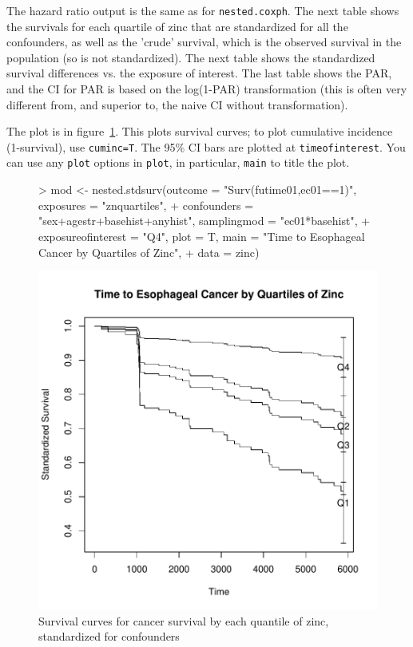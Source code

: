 \documentclass[10pt]{article}
\begin{document}
The hazard ratio output is the same as for \texttt{nested.coxph}.  The next table shows
the survivals for each quartile of zinc that are standardized for all the confounders, as
well as the 'crude' survival, which is the observed survival in the population (so is not
standardized).  The next table shows the standardized survival differences vs. the
exposure of interest.  The last table shows the PAR, and the CI for PAR is based on the
log(1-PAR) transformation (this is often very different from, and superior to, the naive
CI without transformation).

The plot is in figure~\ref{fig:PlotStdSurv}.  This plots survival curves; to plot
cumulative incidence (1-survival), use \texttt{cuminc=T}.  The 95\% CI bars are plotted at
\texttt{timeofinterest}.  You can use any \texttt{plot} options in \texttt{plot}, in
particular, \texttt{main} to title the plot.
\begin{figure}
  \centering
\begin{Schunk}
\begin{Sinput}
> mod <- nested.stdsurv(outcome = "Surv(futime01,ec01==1)", exposures = "znquartiles", 
+     confounders = "sex+agestr+basehist+anyhist", samplingmod = "ec01*basehist", 
+     exposureofinterest = "Q4", plot = T, main = "Time to Esophageal Cancer by Quartiles of Zinc", 
+     data = zinc)
\end{Sinput}
\end{Schunk}
\includegraphics{NestedCohort-PlotStdSurv}
\caption{Survival curves for cancer survival by each quantile of zinc, standardized for confounders}
\label{fig:PlotStdSurv}
\end{figure}
\end{document}
